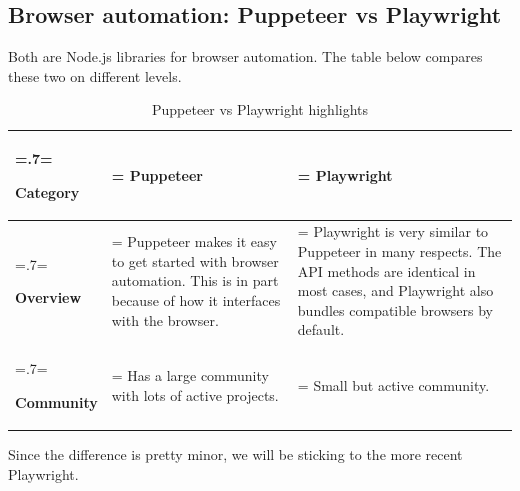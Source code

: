 \subsection{Browser automation: Puppeteer vs Playwright}
Both are Node.js libraries for browser automation. The table below compares these two on different levels.
\begin{table}[H]
    \renewcommand{\arraystretch}{1.5}%
    \caption{Puppeteer vs Playwright highlights}
    \centering
    \medskip
    \begin{tabularx}{1\textwidth} {
            | >{\hsize=.7\hsize\linewidth=\hsize\raggedright\arraybackslash}X
            | >{\hsize=1.15\hsize\linewidth=\hsize\justifying\arraybackslash}X
            | >{\hsize=1.15\hsize\linewidth=\hsize\justifying\arraybackslash}X |}
        \hline
        \rowcolor{primary} \textbf {Category} & \textbf {Puppeteer}                                                                                                                      & \textbf {Playwright}                                                                                                                                                         \\
        \hline
        \textbf {Overview}                    & \noindent Puppeteer makes it easy to get started with browser automation. This is in part because of how it interfaces with the browser. & \noindent Playwright is very similar to Puppeteer in many respects. The API methods are identical in most cases, and Playwright also bundles compatible browsers by default. \\
        \hline
        \textbf {Community}                   & \noindent Has a large community with lots of active projects.                                                                            & \noindent Small but active community.                                                                                                                                        \\
        \hline
    \end{tabularx}
\end{table}
Since the difference is pretty minor, we will be sticking to the more recent Playwright.

